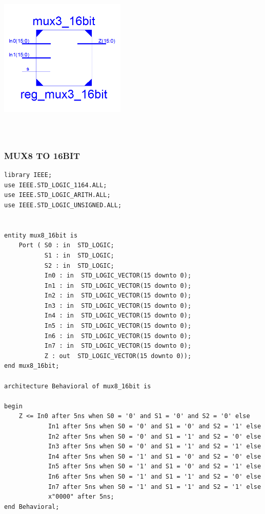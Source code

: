 \documentclass{article}
\begin{document}
\includegraphics[width=6cm, height=8cm]{mux3to16.png}

\pagebreak
\subsubsection{MUX8 TO 16BIT}\label{sec:result}

\begin{lstlisting}
library IEEE;
use IEEE.STD_LOGIC_1164.ALL;
use IEEE.STD_LOGIC_ARITH.ALL;
use IEEE.STD_LOGIC_UNSIGNED.ALL;


entity mux8_16bit is
    Port ( S0 : in  STD_LOGIC;
           S1 : in  STD_LOGIC;
           S2 : in  STD_LOGIC;
           In0 : in  STD_LOGIC_VECTOR(15 downto 0);
           In1 : in  STD_LOGIC_VECTOR(15 downto 0);
           In2 : in  STD_LOGIC_VECTOR(15 downto 0);
           In3 : in  STD_LOGIC_VECTOR(15 downto 0);
           In4 : in  STD_LOGIC_VECTOR(15 downto 0);
           In5 : in  STD_LOGIC_VECTOR(15 downto 0);
           In6 : in  STD_LOGIC_VECTOR(15 downto 0);
           In7 : in  STD_LOGIC_VECTOR(15 downto 0);
           Z : out  STD_LOGIC_VECTOR(15 downto 0));
end mux8_16bit;

architecture Behavioral of mux8_16bit is

begin
	Z <= In0 after 5ns when S0 = '0' and S1 = '0' and S2 = '0' else 
			In1 after 5ns when S0 = '0' and S1 = '0' and S2 = '1' else 
			In2 after 5ns when S0 = '0' and S1 = '1' and S2 = '0' else 
			In3 after 5ns when S0 = '0' and S1 = '1' and S2 = '1' else
			In4 after 5ns when S0 = '1' and S1 = '0' and S2 = '0' else
			In5 after 5ns when S0 = '1' and S1 = '0' and S2 = '1' else
			In6 after 5ns when S0 = '1' and S1 = '1' and S2 = '0' else
			In7 after 5ns when S0 = '1' and S1 = '1' and S2 = '1' else
			x"0000" after 5ns;
end Behavioral;

\end{lstlisting}
\end{document}
